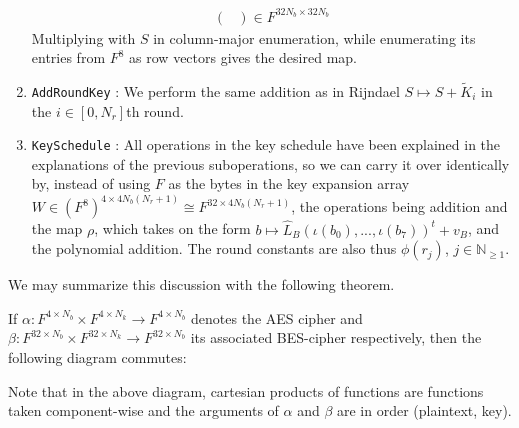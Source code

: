 \begin{enumerate}[label=(\roman*')]
\begin{align}
\begin{pmatrix}
        \end{pmatrix} \in F^{32N_b \times 32N_b}
    \end{align}
    Multiplying with \(S\) in column-major enumeration, while enumerating its entries from \(F^8\) as row vectors gives the desired map.
    \item \texttt{AddRoundKey} \cite[p. 5]{Murphy2002}: We perform the same addition as in Rijndael \(S \mapsto S + \tilde{K}_i\) in the \(i \in [0, N_r]\)th round.
    \item \texttt{KeySchedule} \cite[p. 8]{Murphy2002}: All operations in the key schedule have been explained in the explanations of the previous suboperations, so we can carry it over identically by, instead of using \(F\) as the bytes in the key expansion array \(W \in (F^8)^{4 \times 4N_b(N_r+1)} \cong F^{32 \times 4N_b(N_r+1)}\), the operations being addition and the map \(\rho\), which takes on the form \(b \mapsto \hat{L}_B(\iota(b_0), ..., \iota(b_7))^t+v_B\), and the polynomial addition. The round constants are also thus \(\phi(r_j)\), \(j \in \mathbb{N}_{\geq 1}\).
\end{enumerate}

We may summarize this discussion with the following theorem.

\begin{theorem}
    If \(\alpha\colon F^{4 \times N_b} \times F^{4 \times N_k} \to F^{4 \times N_b}\) denotes the AES cipher and \(\beta\colon F^{32 \times N_b} \times F^{32 \times N_k} \to F^{32 \times N_b}\) its associated BES-cipher respectively, then the following diagram commutes:

    \begin{minipage}{\linewidth}
        \centering
    \end{minipage}
\end{theorem}
Note that in the above diagram, cartesian products of functions are functions taken component-wise and the arguments of \(\alpha\) and \(\beta\) are in order (plaintext, key).

